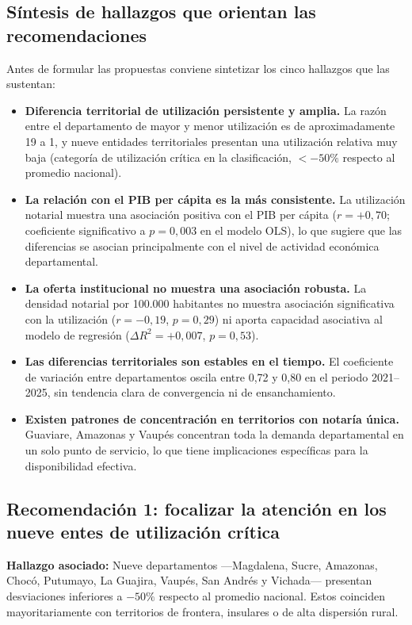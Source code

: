 \documentclass{article}
\begin{document}
\subsection{Síntesis de hallazgos que orientan las recomendaciones}

Antes de formular las propuestas conviene sintetizar los cinco
hallazgos que las sustentan:

\begin{itemize}
    \item \textbf{Diferencia territorial de utilización persistente y amplia.} La razón
    entre el departamento de mayor y menor utilización es de
    aproximadamente 19 a 1, y nueve entidades territoriales presentan
    una utilización relativa muy baja (categoría de utilización crítica
    en la clasificación, $< -50\%$ respecto al promedio nacional).
    \item \textbf{La relación con el PIB per cápita es la más consistente.} La utilización notarial muestra una asociación positiva con el PIB per cápita ($r = +0{,}70$; coeficiente significativo a $p = 0{,}003$ en el modelo OLS), lo que sugiere que las diferencias se asocian principalmente con el nivel de actividad económica departamental.
    \item \textbf{La oferta institucional no muestra una asociación robusta.}
    La densidad notarial por 100.000 habitantes no muestra asociación
    significativa con la utilización ($r = -0{,}19$, $p = 0{,}29$) ni
    aporta capacidad asociativa al modelo de regresión
    ($\Delta R^{2} = +0{,}007$, $p = 0{,}53$).
    \item \textbf{Las diferencias territoriales son estables en el
    tiempo.} El coeficiente de variación entre departamentos oscila
    entre 0{,}72 y 0{,}80 en el periodo 2021--2025, sin tendencia
    clara de convergencia ni de ensanchamiento.
    \item \textbf{Existen patrones de concentración en territorios con
    notaría única.} Guaviare, Amazonas y Vaupés concentran toda la
    demanda departamental en un solo punto de servicio, lo que tiene
    implicaciones específicas para la disponibilidad efectiva.
\end{itemize}

\subsection{Recomendación 1: focalizar la atención en los nueve entes de utilización crítica}

\textbf{Hallazgo asociado:} Nueve departamentos ---Magdalena, Sucre,
Amazonas, Chocó, Putumayo, La Guajira, Vaupés, San Andrés y Vichada---
presentan desviaciones inferiores a $-50\%$ respecto al promedio
nacional. Estos coinciden mayoritariamente con territorios de
frontera, insulares o de alta dispersión rural.
\end{document}
